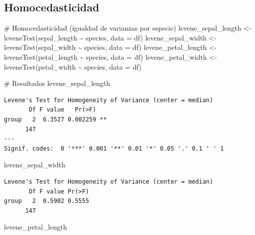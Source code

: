 \documentclass[
  spanish,
  11pt,
  a4paper,
  DIV=11,
  numbers=noendperiod]{scrartcl}
\newenvironment{Shaded}{\begin{snugshade}}{\end{snugshade}}
\newcommand{\AttributeTok}[1]{\textcolor[rgb]{0.40,0.45,0.13}{#1}}
\newcommand{\CommentTok}[1]{\textcolor[rgb]{0.37,0.37,0.37}{#1}}
\newcommand{\FunctionTok}[1]{\textcolor[rgb]{0.28,0.35,0.67}{#1}}
\newcommand{\NormalTok}[1]{\textcolor[rgb]{0.00,0.23,0.31}{#1}}
\newcommand{\OtherTok}[1]{\textcolor[rgb]{0.00,0.23,0.31}{#1}}
\newcommand{\SpecialCharTok}[1]{\textcolor[rgb]{0.37,0.37,0.37}{#1}}
\begin{document}
\subsection{Homocedasticidad}\label{homocedasticidad}

\begin{Shaded}
\begin{Highlighting}[numbers=left,,]
\CommentTok{\# Homocedasticidad (igualdad de varianzas por especie)}
\NormalTok{levene\_sepal\_length  }\OtherTok{\textless{}{-}} \FunctionTok{leveneTest}\NormalTok{(sepal\_length }\SpecialCharTok{\textasciitilde{}}\NormalTok{ species, }\AttributeTok{data =}\NormalTok{ df)}
\NormalTok{levene\_sepal\_width   }\OtherTok{\textless{}{-}} \FunctionTok{leveneTest}\NormalTok{(sepal\_width }\SpecialCharTok{\textasciitilde{}}\NormalTok{ species, }\AttributeTok{data =}\NormalTok{ df)}
\NormalTok{levene\_petal\_length  }\OtherTok{\textless{}{-}} \FunctionTok{leveneTest}\NormalTok{(petal\_length }\SpecialCharTok{\textasciitilde{}}\NormalTok{ species, }\AttributeTok{data =}\NormalTok{ df)}
\NormalTok{levene\_petal\_width   }\OtherTok{\textless{}{-}} \FunctionTok{leveneTest}\NormalTok{(petal\_width }\SpecialCharTok{\textasciitilde{}}\NormalTok{ species, }\AttributeTok{data =}\NormalTok{ df)}

\CommentTok{\# Resultados}
\NormalTok{levene\_sepal\_length}
\end{Highlighting}
\end{Shaded}

\begin{verbatim}
Levene's Test for Homogeneity of Variance (center = median)
       Df F value   Pr(>F)   
group   2  6.3527 0.002259 **
      147                    
---
Signif. codes:  0 '***' 0.001 '**' 0.01 '*' 0.05 '.' 0.1 ' ' 1
\end{verbatim}

\begin{Shaded}
\begin{Highlighting}[numbers=left,,]
\NormalTok{levene\_sepal\_width}
\end{Highlighting}
\end{Shaded}

\begin{verbatim}
Levene's Test for Homogeneity of Variance (center = median)
       Df F value Pr(>F)
group   2  0.5902 0.5555
      147               
\end{verbatim}

\begin{Shaded}
\begin{Highlighting}[numbers=left,,]
\NormalTok{levene\_petal\_length }
\end{Highlighting}
\end{Shaded}
\end{document}
